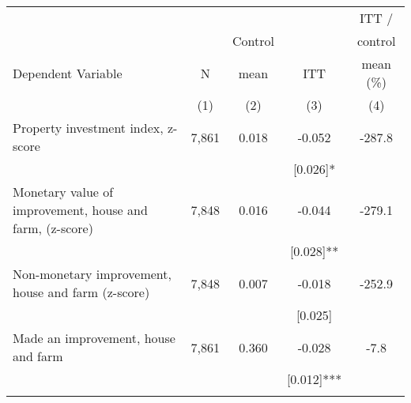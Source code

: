 \begin{tabular}{lcccc}
\hline \noalign{\smallskip} &  &  &  & ITT /\\
 &  & Control &  & control\\
Dependent Variable & N & mean & ITT & mean (\%)\\
 & (1) & (2) & (3) & (4)\\
\noalign{\smallskip}\hline \noalign{\smallskip}Property investment index, z-score & 7,861 & 0.018 & -0.052 & -287.8\\
 &  &  & [0.026]* & \\
\quad Monetary value of improvement, house and farm, (z-score) & 7,848 & 0.016 & -0.044 & -279.1\\
 &  &  & [0.028]** & \\
\quad Non-monetary improvement, house and farm (z-score) & 7,848 & 0.007 & -0.018 & -252.9\\
 &  &  & [0.025] & \\
\quad Made an improvement, house and farm & 7,861 & 0.360 & -0.028 & -7.8\\
 &  &  & [0.012]*** & \\
\noalign{\smallskip}\hline\end{tabular}
